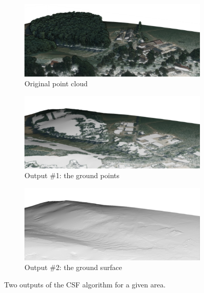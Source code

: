 \begin{figure}
  \centering
  \begin{subfigure}[b]{0.8\linewidth}
    \centering
    \includegraphics[width=\textwidth]{csf_before.png}
    \caption{Original point cloud}
  \end{subfigure}
  \begin{subfigure}[b]{0.8\linewidth}
    \centering
    \includegraphics[width=\textwidth]{csf_onlyground.png}
    \caption{Output \#1: the ground points}
  \end{subfigure}
  \begin{subfigure}[b]{0.8\linewidth}
    \centering
    \includegraphics[width=\textwidth]{csf_after.png}
    \caption{Output \#2: the ground surface}
  \end{subfigure}
\caption{Two outputs of the CSF algorithm for a given area.}%
\label{fig:csf-example}
\end{figure}

